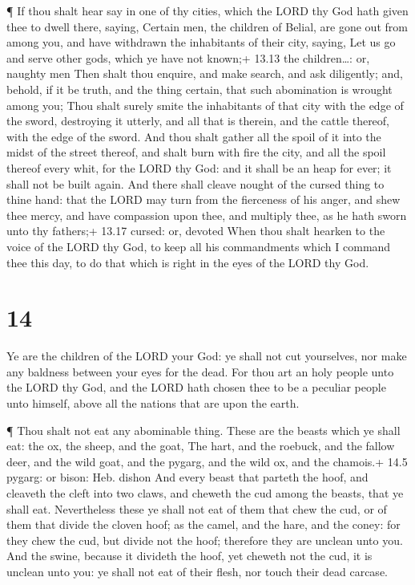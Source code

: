  ¶ If thou shalt hear say in one of thy cities, which the
LORD thy God hath given thee to dwell there, saying, 
Certain men, the children of Belial, are gone out from among you, and
have withdrawn the inhabitants of their city, saying, Let us go and
serve other gods, which ye have not known;+ 13.13 the children\ldots:
or, naughty men  Then shalt thou enquire, and make search,
and ask diligently; and, behold, if it be truth, and the thing certain,
that such abomination is wrought among you;  Thou shalt
surely smite the inhabitants of that city with the edge of the sword,
destroying it utterly, and all that is therein, and the cattle thereof,
with the edge of the sword.  And thou shalt gather all the
spoil of it into the midst of the street thereof, and shalt burn with
fire the city, and all the spoil thereof every whit, for the LORD thy
God: and it shall be an heap for ever; it shall not be built again.
 And there shall cleave nought of the cursed thing to thine
hand: that the LORD may turn from the fierceness of his anger, and shew
thee mercy, and have compassion upon thee, and multiply thee, as he hath
sworn unto thy fathers;+ 13.17 cursed: or, devoted  When
thou shalt hearken to the voice of the LORD thy God, to keep all his
commandments which I command thee this day, to do that which is right in
the eyes of the LORD thy God.

\hypertarget{section-13}{%
\section{14}\label{section-13}}

 Ye are the children of the LORD your God: ye shall not cut
yourselves, nor make any baldness between your eyes for the dead.
 For thou art an holy people unto the LORD thy God, and the
LORD hath chosen thee to be a peculiar people unto himself, above all
the nations that are upon the earth.

 ¶ Thou shalt not eat any abominable thing. 
These are the beasts which ye shall eat: the ox, the sheep, and the
goat,  The hart, and the roebuck, and the fallow deer, and
the wild goat, and the pygarg, and the wild ox, and the chamois.+ 14.5
pygarg: or bison: Heb. dishon  And every beast that parteth
the hoof, and cleaveth the cleft into two claws, and cheweth the cud
among the beasts, that ye shall eat.  Nevertheless these ye
shall not eat of them that chew the cud, or of them that divide the
cloven hoof; as the camel, and the hare, and the coney: for they chew
the cud, but divide not the hoof; therefore they are unclean unto you.
 And the swine, because it divideth the hoof, yet cheweth
not the cud, it is unclean unto you: ye shall not eat of their flesh,
nor touch their dead carcase.

